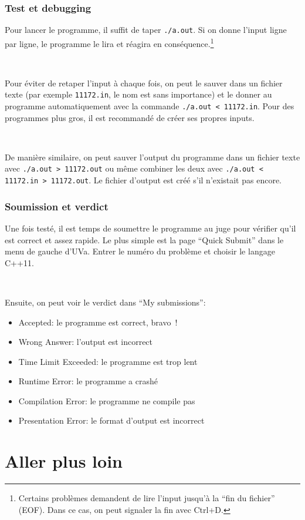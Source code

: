 \documentclass[12pt]{beamer}
\begin{document}
\begin{frame}[fragile]
\frametitle{Test et debugging}
Pour lancer le programme, il suffit de taper \lstinline|./a.out|. Si on donne l'input ligne par ligne, le programme le lira et réagira en conséquence.\footnote{Certains problèmes demandent de lire l'input jusqu'à la ``fin du fichier'' (EOF). Dans ce cas, on peut signaler la fin avec Ctrl+D.}

~

Pour éviter de retaper l'input à chaque fois, on peut le sauver dans un fichier texte (par exemple \lstinline|11172.in|, le nom est sans importance) et le donner au programme automatiquement avec la commande \lstinline|./a.out < 11172.in|. Pour des programmes plus gros, il est recommandé de créer ses propres inputs.

~

De manière similaire, on peut sauver l'output du programme dans un fichier texte avec \lstinline|./a.out > 11172.out| ou même combiner les deux avec \lstinline|./a.out < 11172.in > 11172.out|. Le fichier d'output est créé s'il n'existait pas encore.
\end{frame}

\begin{frame}
\frametitle{Soumission et verdict}
Une fois testé, il est temps de soumettre le programme au juge pour vérifier qu'il est correct et assez rapide. Le plus simple est la page ``Quick Submit'' dans le menu de gauche d'UVa. Entrer le numéro du problème et choisir le langage C++11.

~

Ensuite, on peut voir le verdict dans ``My submissions'':
\begin{itemize}
\item Accepted: le programme est correct, bravo !
\item Wrong Answer: l'output est incorrect
\item Time Limit Exceeded: le programme est trop lent
\item Runtime Error: le programme a crashé
\item Compilation Error: le programme ne compile pas
\item Presentation Error: le format d'output est incorrect
\end{itemize}
\end{frame}

\section{Aller plus loin}
\end{document}
